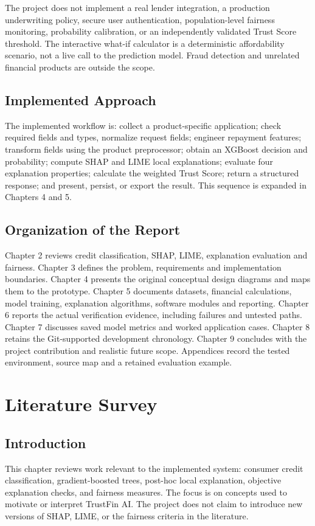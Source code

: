 \documentclass[12pt,a4paper]{report}
\begin{document}
The project does not implement a real lender integration, a production underwriting policy, secure user authentication, population-level fairness monitoring, probability calibration, or an independently validated Trust Score threshold. The interactive what-if calculator is a deterministic affordability scenario, not a live call to the prediction model. Fraud detection and unrelated financial products are outside the scope.

\section{Implemented Approach}
The implemented workflow is: collect a product-specific application; check required fields and types, normalize request fields; engineer repayment features; transform fields using the product preprocessor; obtain an XGBoost decision and probability; compute SHAP and LIME local explanations; evaluate four explanation properties; calculate the weighted Trust Score; return a structured response; and present, persist, or export the result. This sequence is expanded in Chapters 4 and 5.

\section{Organization of the Report}
Chapter 2 reviews credit classification, SHAP, LIME, explanation evaluation and fairness. Chapter 3 defines the problem, requirements and implementation boundaries. Chapter 4 presents the original conceptual design diagrams and maps them to the prototype. Chapter 5 documents datasets, financial calculations, model training, explanation algorithms, software modules and reporting. Chapter 6 reports the actual verification evidence, including failures and untested paths. Chapter 7 discusses saved model metrics and worked application cases. Chapter 8 retains the Git-supported development chronology. Chapter 9 concludes with the project contribution and realistic future scope. Appendices record the tested environment, source map and a retained evaluation example.

\chapter{Literature Survey}
\section{Introduction}
This chapter reviews work relevant to the implemented system: consumer credit classification, gradient-boosted trees, post-hoc local explanation, objective explanation checks, and fairness measures. The focus is on concepts used to motivate or interpret TrustFin AI. The project does not claim to introduce new versions of SHAP, LIME, or the fairness criteria in the literature.
\end{document}
